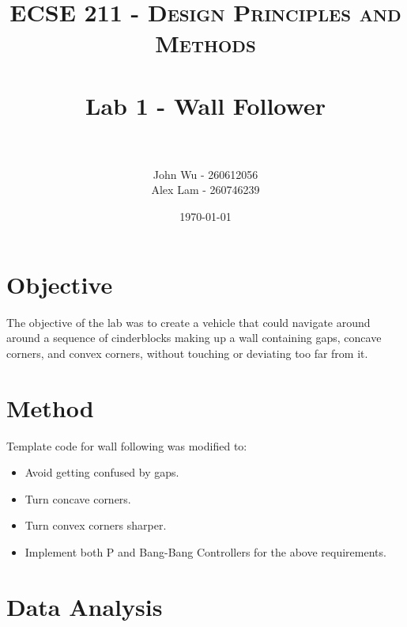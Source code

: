\documentclass[paper=a4, fontsize=11pt]{scrartcl}
\title{
    \usefont{OT1}{bch}{b}{n}
    \normalfont \normalsize \textsc{ECSE 211 - Design Principles and Methods} \\ [25pt]
    \horrule{0.5pt} \\[0.4cm]
    \huge Lab 1 - Wall Follower \\
    \horrule{2pt} \\[0.5cm]
}
\author{John Wu - 260612056 \\ Alex Lam - 260746239}
\date{\today}
\begin{document}
 
\maketitle
 
\section{Objective}

The objective of the lab was to create a vehicle that could navigate around around a sequence of cinderblocks making up a wall containing gaps, concave corners, and convex corners, without touching or deviating too far from it.
 
\section{Method}
 
Template code for wall following was modified to:

\begin{itemize}
  \item Avoid getting confused by gaps.
  \item Turn concave corners.
  \item Turn convex corners sharper.
  \item Implement both P and Bang-Bang Controllers for the above requirements.
  \\[1in]
\end{itemize}

\section{Data Analysis}
\end{document}
